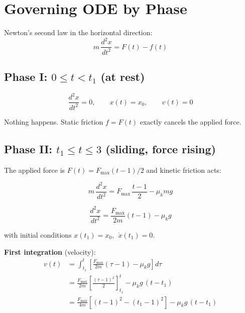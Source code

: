 \documentclass[11pt]{article}
\newcommand{\ddd}[2]{\frac{d^2 #1}{d #2^2}}
\begin{document}
\section{Governing ODE by Phase}

Newton's second law in the horizontal direction:
\begin{equation}
m\,\ddd{x}{t} = F(t) - f(t)
\label{eq:newton}
\end{equation}

\subsection{Phase I: $0 \le t < t_1$ (at rest)}

\begin{equation}
\boxed{\ddd{x}{t} = 0, \qquad x(t) = x_0, \qquad v(t) = 0}
\end{equation}

\noindent
Nothing happens.  Static friction $f = F(t)$ exactly cancels the applied force.

\subsection{Phase II: $t_1 \le t \le 3$ (sliding, force rising)}

The applied force is $F(t) = F_{\max}(t-1)/2$ and kinetic friction acts:

\begin{equation}
m\,\ddd{x}{t} = F_{\max}\,\frac{t - 1}{2} - \mu_k m g
\end{equation}

\begin{equation}
\boxed{\ddd{x}{t} = \frac{F_{\max}}{2m}(t - 1) - \mu_k g}
\label{eq:phase2}
\end{equation}

\noindent
with initial conditions $x(t_1) = x_0$, $\;\dot{x}(t_1) = 0$.

\medskip
\noindent
\textbf{First integration} (velocity):
\begin{align}
v(t) &= \int_{t_1}^{t} \left[\frac{F_{\max}}{2m}(\tau - 1) - \mu_k g\right] d\tau \\[6pt]
     &= \frac{F_{\max}}{2m}\left[\frac{(\tau-1)^2}{2}\right]_{t_1}^{t} - \mu_k g\,(t - t_1) \\[6pt]
     &= \frac{F_{\max}}{4m}\left[(t-1)^2 - (t_1-1)^2\right] - \mu_k g\,(t - t_1)
\label{eq:v_phase2}
\end{align}
\end{document}
